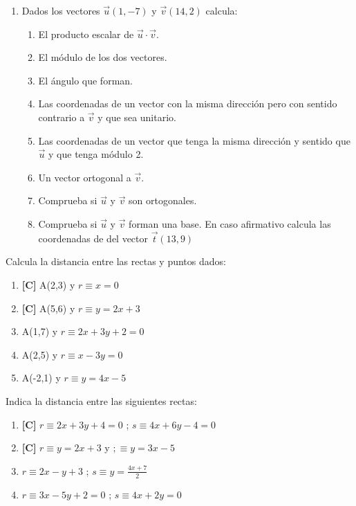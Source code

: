 \begin{enumerate}[topsep=0pt]
	\item Dados los vectores $ \overrightarrow{u}(1,-7)$ y $ \overrightarrow{v} (14,2) $ calcula:
	\begin{enumerate}[topsep=0pt]
		\item El producto escalar de $\overrightarrow{u} \cdot \overrightarrow{v}$.
		\item El módulo de los dos vectores.
		\item El ángulo que forman.
		\item Las coordenadas de un vector con la misma dirección  pero con sentido contrario a $\overrightarrow{v}$ y que sea unitario.
		\item Las coordenadas de un vector que tenga la misma dirección y sentido que $\overrightarrow{u}$ y que tenga módulo 2.
		\item Un vector ortogonal a $\overrightarrow{v}$.
		\item Comprueba si $\vec{u}$ y $\vec{v}$ son ortogonales.
		\item Comprueba si $\vec{u}$ y $\vec{v}$ forman una base. En caso afirmativo calcula las coordenadas de del vector $\overrightarrow{t}(13,9)$
	\end{enumerate}


\end{enumerate}

\Exercicio Calcula la distancia entre las rectas y puntos dados:
\begin{enumerate}[topsep=0pt]
	\item \textbf{[C]} A(2,3) y $ r \equiv x = 0 $
	\item \textbf{[C]} A(5,6) y $ r \equiv y = 2x + 3 $
	
	\item A(1,7) y $ r \equiv 2x + 3y +2 = 0 $
	\item A(2,5) y $ r \equiv x - 3y = 0 $
	\item A(-2,1) y $ r \equiv y = 4x - 5 $
\end{enumerate}


\Exercicio Indica la distancia entre las siguientes rectas:

\begin{enumerate}[topsep=0pt]
	\item \textbf{[C]} $ r \equiv 2x + 3y +4 = 0 $ ; $ s \equiv 4x + 6y - 4 = 0 $
	\item \textbf{[C]} $ r \equiv y = 2x + 3 $ y $ ; \equiv y = 3x - 5 $
	
	\item $ r \equiv 2x - y +3 $ ; $ s \equiv y = \frac{4x + 7}{2}  $
	\item $ r \equiv 3x - 5y +2 = 0 $ ; $ s \equiv 4x + 2y = 0  $
\end{enumerate}


